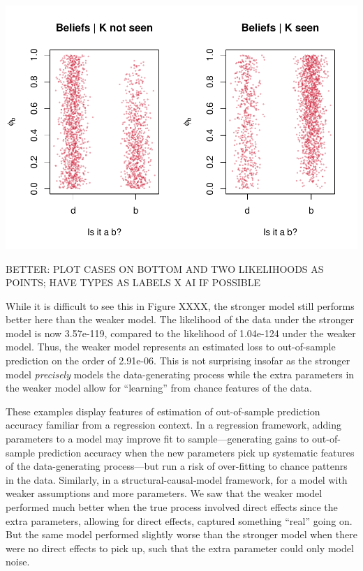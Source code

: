 \documentclass[
  12pt,
]{book}
\begin{document}
\includegraphics{ii_files/figure-latex/unnamed-chunk-25-1.pdf}

BETTER: PLOT CASES ON BOTTOM AND TWO LIKELIHOODS AS POINTS; HAVE TYPES AS LABELS X AI IF POSSIBLE

While it is difficult to see this in Figure XXXX, the stronger model still performs better here than the weaker model. The likelihood of the data under the stronger model is now 3.57e-119, compared to
the likelihood of 1.04e-124 under the weaker model. Thus, the weaker model represents an estimated loss to out-of-sample prediction on the order of 2.91e-06. This is not surprising insofar as the stronger model \emph{precisely} models the data-generating process while the extra parameters in the weaker model allow for ``learning'' from chance features of the data.

These examples display features of estimation of out-of-sample prediction accuracy familiar from a regression context. In a regression framework, adding parameters to a model may improve fit to sample---generating gains to out-of-sample prediction accuracy when the new parameters pick up systematic features of the data-generating process---but run a risk of over-fitting to chance pattenrs in the data. Similarly, in a structural-causal-model framework, for a model with weaker assumptions and more parameters. We saw that the weaker model performed much better when the true process involved direct effects since the extra parameters, allowing for direct effects, captured something ``real'' going on. But the same model performed slightly worse than the stronger model when there were no direct effects to pick up, such that the extra parameter could only model noise.
\end{document}
